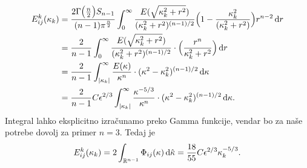 \documentclass[mat2, tisk]{fmfdelo}
\newcommand{\R}{\mathbb R}
\newcommand{\bd}{\textbf}
\begin{document}
\begin{align*}
E_{ij}^k(\kappa_k) 
&= \frac{2 \Gamma\big(\frac{n}{2}\big) S_{n-1}}{(n-1)\pi^\frac{n}{2}} \int_{0}^\infty \frac{E(\sqrt{\kappa_k^2 + r^2})}{(\kappa_k^2 + r^2)^{(n-1)/2}}\Big(1 - \frac{\kappa_k^2}{(\kappa_k^2 + r^2)}\Big) r^{n-2} \dif r \\
&= \frac{2}{n-1} \int_{0}^\infty \frac{E(\sqrt{\kappa_k^2 + r^2})}{(\kappa_k^2 + r^2)^{(n-1)/2}}\cdot\Big(\frac{r^n}{\kappa_k^2 + r^2}\Big) \dif r \\
&= \frac{2}{n-1} \int_{|\kappa_k|}^{\infty} \frac{E(\kappa)}{\kappa^{n}}\cdot (\kappa^2 - \kappa_k^2)^{(n-1)/2} \dif \kappa \\
&= \frac{2}{n-1} C \epsilon^{2/3} \int_{|\kappa_k|}^{\infty} \frac{\kappa^{-5/3}}{\kappa^{n}}\cdot (\kappa^2 - \kappa_k^2)^{(n-1)/2} \dif \kappa.
\end{align*}
Integral lahko eksplicitno izračunamo preko Gamma funkcije, vendar 
bo za naše potrebe dovolj za primer $n=3$. Tedaj je
$$
E_{ij}^k(\kappa_k) = 2 \int_{\R^{n-1}}\Phi_{ij}(\bd{\text{$\kappa$}}) \dif \hat{\bd{\text{$\kappa$}}} = \frac{18}{55} C \epsilon^{2/3} \kappa_k^{-5/3}.
$$
\end{document}
